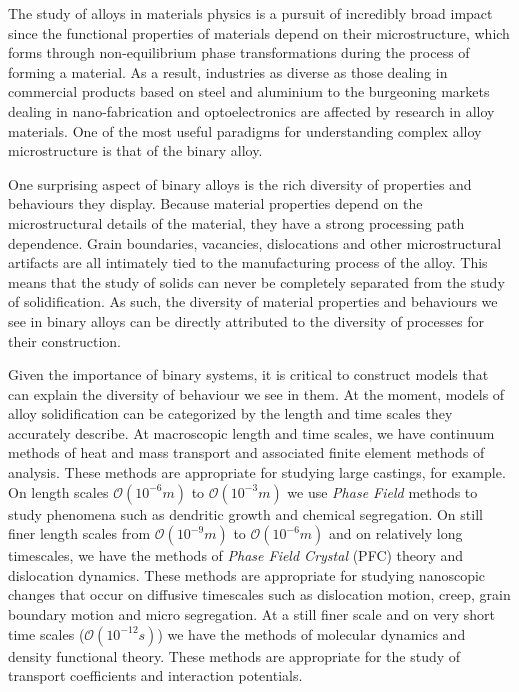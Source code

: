 \label{chapter:introduction}



The study of alloys in materials physics is a pursuit of incredibly broad
impact since the functional properties of materials depend on their
microstructure, which forms through non-equilibrium phase transformations
during the process of forming a material. As a result, industries  as diverse
as those dealing in commercial products based on steel and aluminium to the
burgeoning  markets dealing in nano-fabrication and optoelectronics are
affected by research in alloy materials.  One of the most useful paradigms for
understanding complex alloy microstructure is that of the binary alloy.

One surprising aspect of binary alloys is the rich diversity of properties and
behaviours they display. Because material properties depend on the
microstructural details of the material, they have a strong processing path
dependence.  Grain boundaries, vacancies, dislocations and other
microstructural artifacts are all intimately tied to the manufacturing process
of the alloy. This means that the study of solids can never be completely
separated from the study of solidification. As such, the diversity of material
properties and behaviours we see in binary alloys can be directly attributed to
the diversity of processes for their construction.

Given the importance of binary systems, it is critical to construct models that
can explain the diversity of behaviour we see in them. At the moment, models of
alloy solidification can be categorized by the length and time scales they
accurately describe. At macroscopic length and time scales, we have continuum
methods of heat and mass transport and associated finite element methods of
analysis. These methods are appropriate for studying large castings, for
example. On length scales $\mathcal{O}(10^{-6}m)$ to $\mathcal{O}(10^{-3}m)$ we
use \textit{Phase Field} methods to study phenomena such as dendritic growth
and chemical segregation. On still finer length scales from
$\mathcal{O}(10^{-9}m)$ to $\mathcal{O}(10^{-6}m)$ and on relatively long
timescales, we have the methods of \textit{Phase Field Crystal} (PFC) theory
and dislocation dynamics.  These methods are appropriate for studying
nanoscopic changes that occur on diffusive timescales such as dislocation
motion, creep, grain boundary motion and micro segregation. At a still finer
scale and on very short time scales ($\mathcal{O}(10^{-12}s)$) we have the
methods of molecular dynamics and density functional theory. These methods are
appropriate for the study of transport coefficients and interaction potentials.

